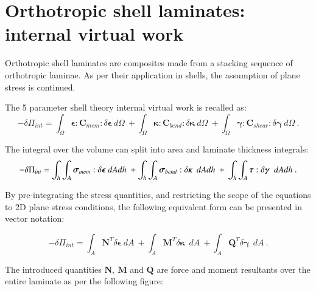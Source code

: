 \section{Orthotropic shell laminates: internal virtual work}

Orthotropic shell laminates are composites made from a stacking sequence of orthotropic laminae. As per their application in shells, the assumption of plane stress is continued.

The 5 parameter shell theory internal virtual work is recalled as:
\begin{equation} 
-\delta\Pi_{int} =
\int_\Omega
\boldsymbol{\epsilon}
:
\mathbf{C}_{mem}
:
\delta \boldsymbol{\epsilon}\ d \Omega\ 
+
\int_\Omega
\boldsymbol{\kappa}
:
\mathbf{C}_{bend}
:
\delta \boldsymbol{\kappa}\ 
d \Omega\ 
+
\int_\Omega
\boldsymbol{\gamma}
:
\mathbf{C}_{shear}
:
\delta \boldsymbol{\gamma}\ 
d \Omega
\label{eqsrm4_in_composite1}\ .
\end{equation}

The integral over the volume can split into area and laminate thickness integrals:
\begin{equation} 
-\delta\Pi_{int} =
\int_h
\int_A
\boldsymbol{\sigma}_{mem}
:
\delta \boldsymbol{\epsilon}\ dAdh\ 
+
\int_h
\int_A
\boldsymbol{\sigma}_{bend}
:
\delta \boldsymbol{\kappa}\ 
\ dAdh\ 
+\\
\int_h
\int_A
\boldsymbol{\tau}
:
\delta \boldsymbol{\gamma}\ 
\ dAdh
\label{eqsrm4_in_composite2}\ .
\end{equation}

By pre-integrating the stress quantities, and restricting the scope of the equations to 2D plane stress conditions, the following equivalent form can be presented in vector notation:

\begin{equation} 
-\delta\Pi_{int} =
\int_A
\mathbf{N}^T
\delta \boldsymbol{\epsilon}
\ dA\ 
+
\int_A
\mathbf{M}^T
\delta \boldsymbol{\kappa}\ 
\ dA\ 
+
\int_A
\mathbf{Q}^T
\delta \boldsymbol{\gamma}\ 
\ dA
\label{eqsrm4_in_composite3}\ .
\end{equation}

The introduced quantities $\mathbf{N,\ M}$ and $\mathbf{Q}$ are force and moment resultants over the entire laminate as per the following figure:

